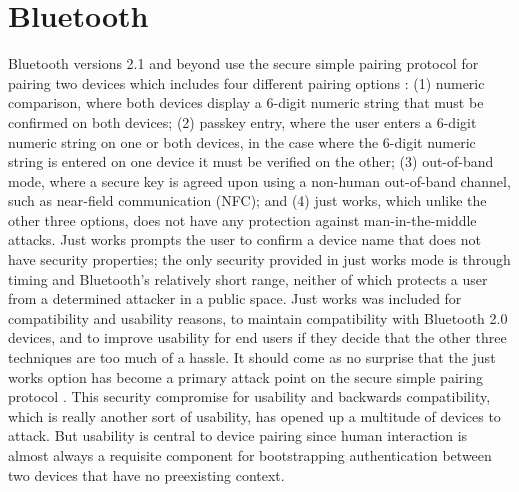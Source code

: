 \documentclass[12pt]{report}
\begin{document}
\section{Bluetooth}
Bluetooth versions 2.1 and beyond use the secure simple pairing protocol for pairing two devices which includes four different pairing options \cite{Bluetooth40Spec2010,SimplePairingAnalysisBluetooth4Phan2010,FormalAuthAnalysisBluetoothChang2007}: (1) numeric comparison, where both devices display a 6-digit numeric string that must be confirmed on both devices; (2) passkey entry, where the user enters a 6-digit numeric string on one or both devices, in the case where the 6-digit numeric string is entered on one device it must be verified on the other; (3) out-of-band mode, where a secure key is agreed upon using a non-human out-of-band channel, such as near-field communication (NFC); and (4) just works, which unlike the other three options, does not have any protection against man-in-the-middle attacks. Just works prompts the user to confirm a device name that does not have security properties; the only security provided in just works mode is through timing and Bluetooth's relatively short range, neither of which protects a user from a determined attacker in a public space. Just works was included for compatibility and usability reasons, to maintain compatibility with Bluetooth 2.0 devices, and to improve usability for end users \cite{BluetoothInterfaceFlowSecureSimplePairing2007} if they decide that the other three techniques are too much of a hassle. It should come as no surprise that the just works option has become a primary attack point on the secure simple pairing protocol \cite{BluetoothSSPAttackJustWorksHaataja2008}. This security compromise for usability and backwards compatibility, which is really another sort of usability, has opened up a multitude of devices to attack. But usability is central to device pairing since human interaction is almost always a requisite component for bootstrapping authentication between two devices that have no preexisting context. \par
\end{document}
